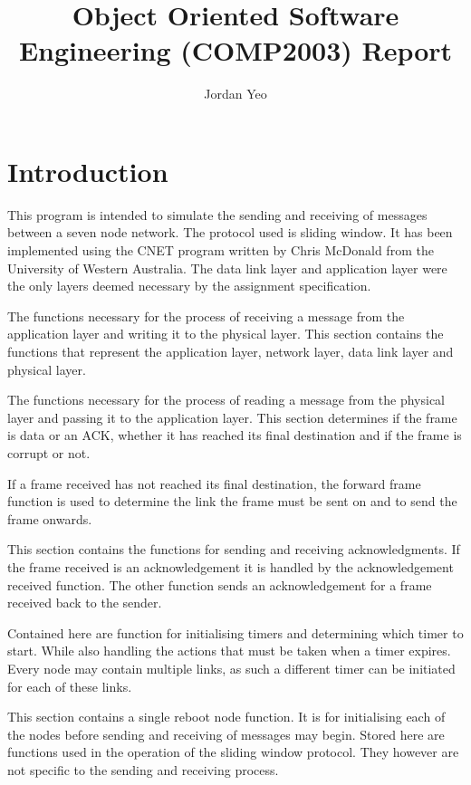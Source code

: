 \documentclass{worksheet}
\title{Object Oriented Software Engineering (COMP2003) Report \\ }
\author{Jordan Yeo}
\begin{document}
\section*{Introduction}
This program is intended to simulate the sending and receiving of messages between a seven node network. The protocol used is sliding window. It has been implemented using the CNET program written by Chris McDonald from the University of Western Australia. The data link layer and application layer were the only layers deemed necessary by the assignment specification. 


The functions necessary for the process of receiving a message from the application layer and writing it to the physical layer. This section contains the functions that represent the application layer, network layer, data link layer and physical layer.


The functions necessary for the process of reading a message from the physical layer and passing it to the application layer. This section determines if the frame is data or an ACK, whether it has reached its final destination and if the frame is corrupt or not.

If a frame received has not reached its final destination, the forward frame function is used to determine the link the frame must be sent on and to send the frame onwards. 

 This section contains the functions for sending and receiving acknowledgments. If the frame received is an acknowledgement it is handled by the acknowledgement received function. The other function sends an acknowledgement for a frame received back to the sender.
 
Contained here are function for initialising timers and determining which timer to start. While also handling the actions that must be taken when a timer expires. Every node may contain multiple links, as such a different timer can be initiated for each of these links. 

This section contains a single reboot node function. It is for initialising each of the nodes before sending and receiving of messages may begin. 
Stored here are functions used in the operation of the sliding window protocol. They however are not specific to the sending and receiving process. 
\end{document}
